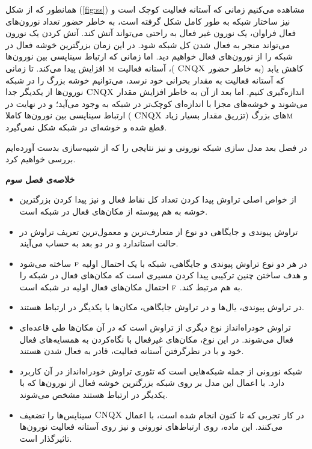 همانطور که  از شکل (\ref{fig:ss}) مشاهده می‌کنیم زمانی که آستانه فعالیت کوچک است و نیز ساختار شبکه به طور کامل شکل گرفته است، به خاطر حضور تعداد نورون‌های فعال فراوان، یک نورون غیر فعال به راحتی می‌تواند آتش کند. آتش کردن یک نورون می‌تواند منجر به فعال شدن کل شبکه شود. در این زمان بزرگترین خوشه فعال در شبکه را از نورون‌های فعال خواهیم دید. اما زمانی که ارتباط سیناپسی بین نورون‌ها کاهش یابد (به خاطر حضور   $\textsc{CNQX}$ )، آستانه فعالیت 
$\textsc{m}$
 افزایش پیدا می‌کند. تا زمانی که آستانه فعالیت به مقدار بحرانی خود نرسد، می‌توانیم خوشه بزرگ را در شبکه اندازه‌گیری کنیم. اما بعد از آن به خاطر افزایش مقدار   $\textsc{CNQX}$   نورون‌ها از یکدیگر جدا می‌شوند و خوشه‌های مجزا با اندازه‌ای کوچک‌تر در شبکه به وجود می‌آید؛ و در نهایت در
 $\textsc{m}$های بزرگ (تزریق مقدار بسیار زیاد   $\textsc{CNQX}$ ) ارتباط سیناپسی بین نورون‌ها کاملا قطع شده و خوشه‌ای در شبکه شکل نمی‌گیرد. 
 
در فصل بعد مدل سازی شبکه نورونی و نیز نتایجی را که از شبیه‌سازی بدست آورده‌ایم بررسی خواهیم کرد.

  
 
 
 

 \newpage 
\textbf{خلاصه‌ی فصل سوم}    \begin{itemize}
\item از خواص اصلی تراوش پیدا کردن تعداد کل نقاط فعال و نیز پیدا کردن بزرگترین خوشه به هم پیوسته از مکان‌‌های فعال در شبکه است.
\item تراوش پیوندی و جایگاهی دو نوع از متعارف‌ترین و معمول‌ترین تعریف تراوش  در حالت استاندارد و در دو بعد به حساب می‌آیند.
\item در هر دو نوع تراوش پیوندی و جایگاهی، شبکه با یک احتمال اولیه $\textsc{f}$ ساخته می‌شود و هدف ساختن چنین ترکیبی پیدا کردن مسیری است که مکان‌های فعال در شبکه را به هم مرتبط کند. $\textsc{f}$ احتمال مکان‌های فعال اولیه در شبکه است.
\item در تراوش پیوندی، یال‌ها و در تراوش جایگاهی، مکان‌ها با یکدیگر در ارتباط هستند. 
\item تراوش  خودراه‌انداز نوع دیگری از تراوش است که در آن مکان‌ها طی قاعده‌ای فعال می‌شوند. در این نوع، مکان‌های غیرفعال با نگاه‌کردن به همسایه‌های فعال خود و با در نظرگرفتن آستانه فعالیت، قادر به فعال شدن هستند.
\item شبکه نورونی از جمله شبکه‌هایی است که تئوری تراوش خودراه‌انداز در آن کاربرد دارد. با اعمال این  مدل بر روی شبکه بزرگترین خوشه فعال از نورون‌ها که با یکدیگر در ارتباط هستند مشخص می‌شوند. 
\item در کار تجربی که تا کنون انجام شده است، با اعمال   $\textsc{CNQX}$  سیناپس‌ها را تضعیف می‌کنند.
این ماده، روی ارتباط‌های نورونی‌ و نیز روی آستانه فعالیت نورون‌ها تاثیرگذار است. 
\end{itemize}








 


 









 
